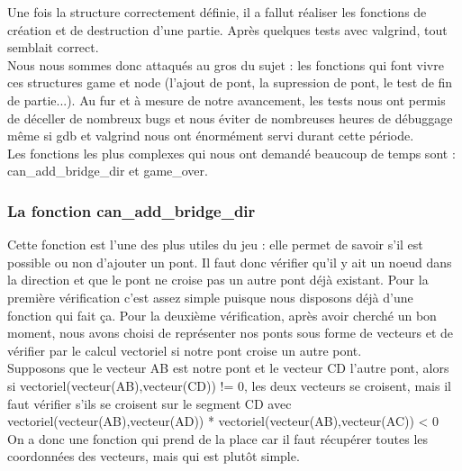 \documentclass[12pt]{report}
\begin{document}
\textnormal{Une fois la structure correctement définie, il a fallut réaliser les fonctions de création et de destruction d'une partie. Après quelques tests avec valgrind, tout semblait correct.\\ Nous nous sommes donc attaqués au gros du sujet : les fonctions qui font vivre ces structures game et node (l'ajout de pont, la supression de pont, le test de fin de partie...). Au fur et à mesure de notre avancement, les tests nous ont permis de déceller de nombreux bugs et nous éviter de nombreuses heures de débuggage même si gdb et valgrind nous ont énormément servi durant cette période.\\ Les fonctions les plus complexes qui nous ont demandé beaucoup de temps sont : can\_add\_bridge\_dir et game\_over.}

\subsubsection{La fonction can\_add\_bridge\_dir}
\textnormal{Cette fonction est l'une des plus utiles du jeu : elle permet de savoir s'il est possible ou non d'ajouter un pont. Il faut donc vérifier qu'il y ait un noeud dans la direction et que le pont ne croise pas un autre pont déjà existant. Pour la première vérification c'est assez simple puisque nous disposons déjà d'une fonction qui fait ça. Pour la deuxième vérification, après avoir cherché un bon moment, nous avons choisi de représenter nos ponts sous forme de vecteurs et de vérifier par le calcul vectoriel si notre pont croise un autre pont. \\ Supposons que le vecteur AB est notre pont et le vecteur CD l'autre pont, alors si vectoriel(vecteur(AB),vecteur(CD)) != 0, les deux vecteurs se croisent, mais il faut vérifier s'ils se croisent sur le segment CD avec vectoriel(vecteur(AB),vecteur(AD)) * vectoriel(vecteur(AB),vecteur(AC)) < 0\\On a donc une fonction qui prend de la place car il faut récupérer toutes les coordonnées des vecteurs, mais qui est plutôt simple.}
\end{document}
